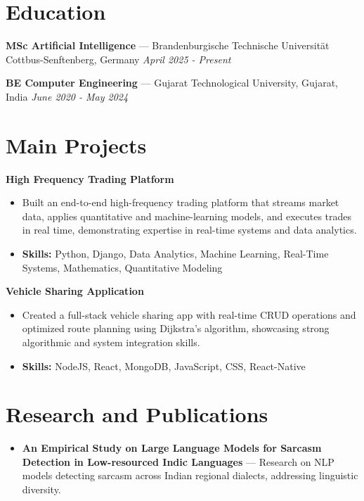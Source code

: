 \documentclass[a4paper,10pt]{article}
\begin{document}
\section*{Education}
\textbf{MSc Artificial Intelligence} — Brandenburgische Technische Universität Cottbus-Senftenberg, Germany \hfill \textit{April 2025 - Present}\par
\vspace{1.5pt}
\textbf{BE Computer Engineering} — Gujarat Technological University, Gujarat, India \hfill \textit{June 2020 - May 2024}\par

\section*{Main Projects}
\textbf{High Frequency Trading Platform}\par
\vspace{1pt}
\begin{itemize}
  \item Built an end-to-end high-frequency trading platform that streams market data, applies quantitative and machine-learning models, and executes trades in real time, demonstrating expertise in real-time systems and data analytics.
  \item \textbf{Skills:} Python, Django, Data Analytics, Machine Learning, Real-Time Systems, Mathematics, Quantitative Modeling
\end{itemize}
\vspace{3pt}
\textbf{Vehicle Sharing Application}\par
\vspace{1pt}
\begin{itemize}
  \item Created a full-stack vehicle sharing app with real-time CRUD operations and optimized route planning using Dijkstra's algorithm, showcasing strong algorithmic and system integration skills.
  \item \textbf{Skills:} NodeJS, React, MongoDB, JavaScript, CSS, React-Native
\end{itemize}

\section*{Research and Publications}
\begin{itemize}
\item \textbf{An Empirical Study on Large Language Models for Sarcasm Detection in Low-resourced Indic Languages} — Research on NLP models detecting sarcasm across Indian regional dialects, addressing linguistic diversity.
\end{itemize}
\end{document}

